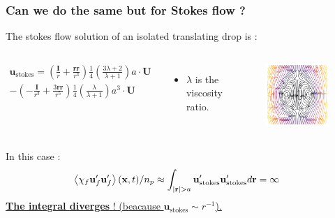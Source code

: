 \documentclass{sintefbeamer}
\begin{document}
\begin{frame}
  \frametitle{Can we do the same but for Stokes flow ?}
  The stokes flow solution of an isolated translating drop is :
  \begin{columns}
  \begin{multline*}
    \textbf{u}_\text{stokes} 
    = \left(\frac{ \textbf{I}}{r} + \frac{\textbf{rr}}{r^3}\right)  \frac{1}{4}\left(\frac{3\lambda + 2}{\lambda +1}\right) a \cdot \textbf{U}\\
    - \left(-\frac{\textbf{I}}{r^3} + \frac{3 \textbf{rr} }{r^5}\right)  \frac{1}{4}\left(\frac{\lambda}{\lambda +1}\right) a^3 \cdot \textbf{U}
  \end{multline*}
  \begin{itemize}
      \item $\lambda$ is the viscosity ratio.
  \end{itemize}
  \begin{figure}
    \includegraphics[width=\textwidth]{image/Rising_Stokes.png}
  \end{figure}
  \end{columns}
\pause
  In this case : 
  \begin{align*}
    \left<\chi_f \textbf{u}'_f\textbf{u}'_f\right>(\textbf{x},t) / n_p
    &\approx 
    \int_{|\textbf{r}| > a} \textbf{u}'_\text{stokes}\textbf{u}'_\text{stokes}   d\textbf{r}
    =\infty 
  \end{align*}
  \underline{\textbf{The integral diverges}  ! (beacause $\textbf{u}_\text{stokes} \sim r^{-1}$).}
\end{frame}
\end{document}
